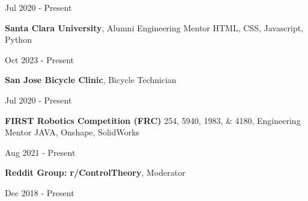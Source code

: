 \vspace{-4.5ex}
\begin{subtitle}
    Jul 2020 - Present
\end{subtitle}
\vspace{-1.5ex}

{\hspace{-1.73in}\small
\textbf{Santa Clara University}, Alumni Engineering Mentor } {\color{cyan}\small HTML, CSS, Javascript, Python}

\vspace{-4.5ex}
\begin{subtitle}
    Oct 2023 - Present
\end{subtitle}
\vspace{-1.5ex}

{\hspace{-1.73in}\small
\textbf{San Jose Bicycle Clinic}, Bicycle Technician }

\vspace{-4.5ex}
\begin{subtitle}
    Jul 2020 - Present
\end{subtitle}
\vspace{-1.5ex}

{\hspace{-1.73in}\small
\textbf{FIRST Robotics Competition (FRC)} 254, 5940, 1983, \& 4180, Engineering Mentor } {\color{cyan}\small JAVA, Onshape, SolidWorks}

\vspace{-4.5ex}
\begin{subtitle}
    Aug 2021 - Present
\end{subtitle}
\vspace{-1.5ex}

{\hspace{-1.73in}\small
\textbf{Reddit Group: r/ControlTheory}, Moderator}

\vspace{-4.5ex}
\begin{subtitle}
    Dec 2018 - Present
\end{subtitle}
\vspace{1ex}



